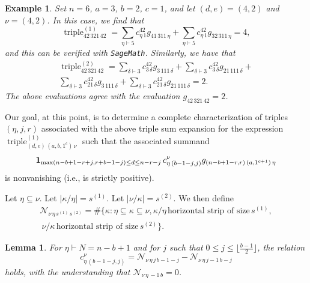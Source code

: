 \documentclass[12pt]{article}
\newtheorem{lemma}{Lemma}%
\newtheorem{example}{Example}
\begin{document}
\begin{example}
 Set $n =6$, $a = 3$, $b = 2$, $c = 1$, and let $(d, e) = (4, 2)$ and $\nu = (4, 2)$. In this case, we find that 
 $$ \operatorname{triple}^{(1)}_{42 \, 321 \, 42} = \sum_{\eta \vdash 5} c_{\eta \, 1}^{42} g_{41 \, 311 \, \eta} + \sum_{\eta \vdash 
 5} c_{\eta \, 1}^{42} g_{32 \, 311 \, \eta} = 4, $$ and this can be verified with {\tt SageMath}. Similarly, we have that 
\begin{multline*}
 \operatorname{triple}^{(2)}_{42 \, 321 \, 42} 
 = \sum_{\delta \vdash 3} c_{3 \, \delta}^{42} g_{3 \, 111 \, \delta} + \sum_{\delta \vdash 3} c_{3 \, \delta}^{42} 
 g_{21 \, 111 \, \delta} + \\ 
 \sum_{\delta \vdash 3} c_{21 \, \delta}^{42} g_{3 \, 111 \, \delta} + 
 \sum_{\delta \vdash 3} c_{21 \, \delta}^{42} g_{21 \, 111 \, \delta} = 2. 
\end{multline*}
 The above evaluations agree with the evaluation $g_{42 \, 321 \, 42} = 2$.
\end{example}

 Our goal, at this point, is to determine a complete characterization of triples $(\eta, j, r)$ associated with the above triple sum expansion 
 for the expression $\operatorname{triple}^{(1)}_{(d, e) \, (a, b, 1^c) \, \nu}$ such that the associated summand $$ \text{{\bf 1}}_{\max( n 
 - b + 1 - r + j, r + b - 1 - j ) \leq d \leq n - r - j } \, c_{\eta \, (b-1-j, j)}^{\nu} g_{ (n - b + 1 - r, r) \, (a, 1^{c+1}) \, \eta }$$ is nonvanishing 
 (i.e., is strictly positive). 
 
 Let $\eta \subseteq \nu$. Let $|\kappa / \eta| = s^{(1)}$. Let $|\nu / \kappa| = s^{(2)}$. We then define 
 \begin{multline*}
 \mathcal{N}_{\nu \, \eta \, s^{(1)} \, s^{(2)}} = \# \{ \kappa : \eta \subseteq \kappa \subseteq \nu, \kappa/\eta \, 
 \text{horizontal strip of size} \, s^{(1)}, \\ 
 \ \nu/\kappa \, \text{horizontal strip of size} \, s^{(2)} \}. 
\end{multline*}

\begin{lemma}\label{LrtoNN}
 For $\eta \vdash N =n-b+1$ and for $j$ such that $0 \leq j \leq \lfloor \frac{b-1}{2} \rfloor$, the relation $$ c_{\eta \, (b-1-j,j)}^{\nu} = 
 \mathcal{N}_{\nu \, \eta \, j \, b - 1 - j} - \mathcal{N}_{\nu \, \eta \, j - 1 \, b - j} $$ holds, with the understanding that $\mathcal{N}_{\nu 
 \, \eta \, -1 \, b} = 0$. 
\end{lemma}
\end{document}
